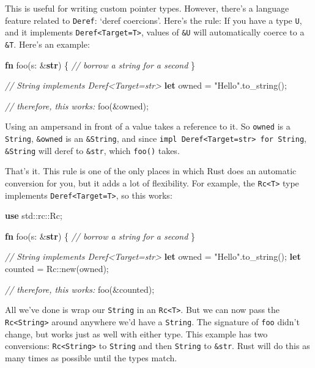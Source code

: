 \documentclass[a4paper,]{book}
\newenvironment{Shaded}{\begin{snugshade}}{\end{snugshade}}
\newcommand{\KeywordTok}[1]{\textcolor[rgb]{0.13,0.29,0.53}{\textbf{{#1}}}}
\newcommand{\StringTok}[1]{\textcolor[rgb]{0.31,0.60,0.02}{{#1}}}
\newcommand{\CommentTok}[1]{\textcolor[rgb]{0.56,0.35,0.01}{\textit{{#1}}}}
\newcommand{\NormalTok}[1]{{#1}}
\begin{document}
This is useful for writing custom pointer types. However, there's a
language feature related to \texttt{Deref}: `deref coercions'. Here's
the rule: If you have a type \texttt{U}, and it implements
\texttt{Deref\textless{}Target=T\textgreater{}}, values of \texttt{\&U}
will automatically coerce to a \texttt{\&T}. Here's an example:

\begin{Shaded}
\begin{Highlighting}[]
\KeywordTok{fn} \NormalTok{foo(s: &}\KeywordTok{str}\NormalTok{) \{}
    \CommentTok{// borrow a string for a second}
\NormalTok{\}}

\CommentTok{// String implements Deref<Target=str>}
\KeywordTok{let} \NormalTok{owned = }\StringTok{"Hello"}\NormalTok{.to_string();}

\CommentTok{// therefore, this works:}
\NormalTok{foo(&owned);}
\end{Highlighting}
\end{Shaded}

Using an ampersand in front of a value takes a reference to it. So
\texttt{owned} is a \texttt{String}, \texttt{\&owned} is an
\texttt{\&String}, and since
\texttt{impl\ Deref\textless{}Target=str\textgreater{}\ for\ String},
\texttt{\&String} will deref to \texttt{\&str}, which \texttt{foo()}
takes.

That's it. This rule is one of the only places in which Rust does an
automatic conversion for you, but it adds a lot of flexibility. For
example, the \texttt{Rc\textless{}T\textgreater{}} type implements
\texttt{Deref\textless{}Target=T\textgreater{}}, so this works:

\begin{Shaded}
\begin{Highlighting}[]
\KeywordTok{use} \NormalTok{std::rc::Rc;}

\KeywordTok{fn} \NormalTok{foo(s: &}\KeywordTok{str}\NormalTok{) \{}
    \CommentTok{// borrow a string for a second}
\NormalTok{\}}

\CommentTok{// String implements Deref<Target=str>}
\KeywordTok{let} \NormalTok{owned = }\StringTok{"Hello"}\NormalTok{.to_string();}
\KeywordTok{let} \NormalTok{counted = Rc::new(owned);}

\CommentTok{// therefore, this works:}
\NormalTok{foo(&counted);}
\end{Highlighting}
\end{Shaded}

All we've done is wrap our \texttt{String} in an
\texttt{Rc\textless{}T\textgreater{}}. But we can now pass the
\texttt{Rc\textless{}String\textgreater{}} around anywhere we'd have a
\texttt{String}. The signature of \texttt{foo} didn't change, but works
just as well with either type. This example has two conversions:
\texttt{Rc\textless{}String\textgreater{}} to \texttt{String} and then
\texttt{String} to \texttt{\&str}. Rust will do this as many times as
possible until the types match.
\end{document}
